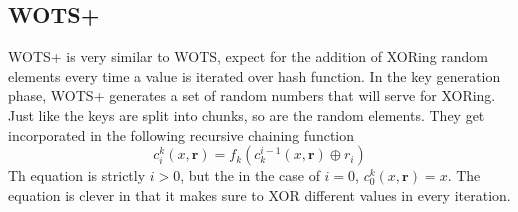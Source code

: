 \documentclass[]{scrartcl}
\begin{document}
\subsection*{WOTS+}
WOTS+ is very similar to WOTS, expect for the addition of XORing random elements every time a value is iterated over hash function. In the key generation phase, WOTS+ generates a set of random numbers that will serve for XORing. Just like the keys are split into chunks, so are the random elements. They get incorporated in the following recursive chaining function
\begin{equation}
c_{i}^{k}(x,\textbf{r}) = f_{k}(c_{k}^{i-1}(x,\textbf{r}) \oplus r_{i})
\end{equation}
Th equation is strictly $i > 0$, but the in the case of $i = 0$, $c_{0}^{k}(x,\textbf{r}) = x$. The equation is clever in that it makes sure to XOR different values in every iteration. 
\end{document}
